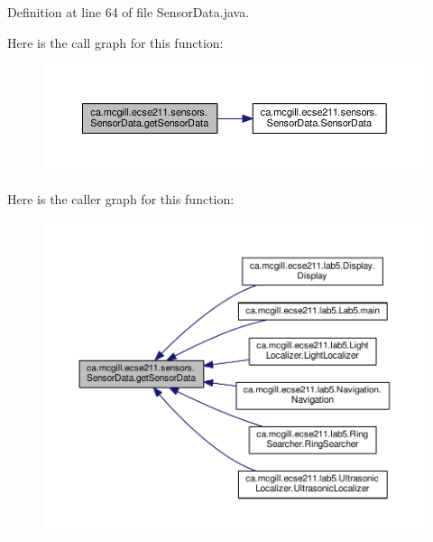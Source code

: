 Definition at line 64 of file Sensor\+Data.\+java.

Here is the call graph for this function\+:
\nopagebreak
\begin{figure}[H]
\begin{center}
\leavevmode
\includegraphics[width=350pt]{classca_1_1mcgill_1_1ecse211_1_1sensors_1_1_sensor_data_ab8aef4bdb5d9f3dad399656e00af2539_cgraph}
\end{center}
\end{figure}
Here is the caller graph for this function\+:
\nopagebreak
\begin{figure}[H]
\begin{center}
\leavevmode
\includegraphics[width=350pt]{classca_1_1mcgill_1_1ecse211_1_1sensors_1_1_sensor_data_ab8aef4bdb5d9f3dad399656e00af2539_icgraph}
\end{center}
\end{figure}
\mbox{\label{classca_1_1mcgill_1_1ecse211_1_1sensors_1_1_sensor_data_ae20bf127c57dcfcb3b7632ca05b6d482}} 

